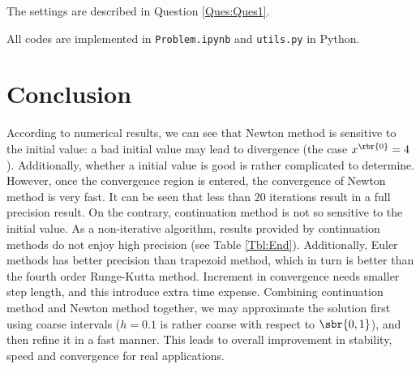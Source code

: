 \documentclass[english, nochinese]{pkupaper}
\begin{document}
The settings are described in Question \ref{Ques:Ques1}.

All codes are implemented in \verb"Problem.ipynb" and \verb"utils.py" in Python.

\section{Conclusion}

According to numerical results, we can see that Newton method is sensitive to the initial value: a bad initial value may lead to divergence (the case $ x^{\rbr{0}} = 4 $). Additionally, whether a initial value is good is rather complicated to determine. However, once the convergence region is entered, the convergence of Newton method is very fast. It can be seen that less than 20 iterations result in a full precision result. On the contrary, continuation method is not so sensitive to the initial value. As a non-iterative algorithm, results provided by continuation methods do not enjoy high precision (see Table \ref{Tbl:End}). Additionally, Euler methods has better precision than trapezoid method, which in turn is better than the fourth order Runge-Kutta method. Increment in convergence needs smaller step length, and this introduce extra time expense. Combining continuation method and Newton method together, we may approximate the solution first using coarse intervals ($ h = 0.1 $ is rather coarse with respect to $ \sbr{ 0, 1 } $), and then refine it in a fast manner. This leads to overall improvement in stability, speed and convergence for real applications.
\end{document}
